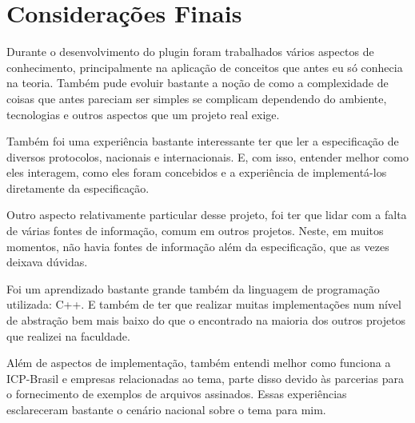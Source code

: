 \chapter[Considerações Finais]{Considerações Finais}

Durante o desenvolvimento do plugin foram trabalhados vários aspectos de conhecimento, principalmente na aplicação 
de conceitos que antes eu só conhecia na teoria. Também pude evoluir bastante a noção de como a complexidade de coisas
que antes pareciam ser simples se complicam dependendo do ambiente, tecnologias e outros aspectos 
que um projeto real exige.

Também foi uma experiência bastante interessante ter que ler a especificação de diversos protocolos, nacionais e internacionais. E, com
isso, entender melhor como eles interagem, como eles foram concebidos e a experiência de implementá-los diretamente da especificação.

Outro aspecto relativamente particular desse projeto, foi ter que lidar com a falta de várias fontes de informação, comum em outros
projetos. Neste, em muitos momentos, não havia fontes de informação além da especificação, que as vezes deixava dúvidas.

Foi um aprendizado bastante grande também da linguagem de programação utilizada: C++. E também de ter que realizar muitas implementações
num nível de abstração bem mais baixo do que o encontrado na maioria dos outros projetos que realizei na faculdade.

Além de aspectos de implementação, também entendi melhor como funciona a ICP-Brasil e empresas relacionadas ao tema, parte disso devido
às parcerias para o fornecimento de exemplos de arquivos assinados. Essas experiências esclareceram bastante o cenário nacional sobre o tema para mim.
